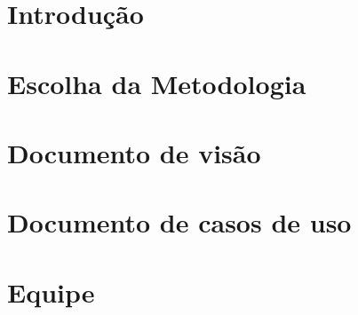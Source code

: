 \section{Introdução} %
\label{sec:introdu_o}
 

\section{Escolha da Metodologia} %
\label{sec:metodologia}
 

\section{Documento de visão}
\label{sec:document_de_visao}


\section{Documento de casos de uso}
\label{sec:documento_de_caso_de_uso}


\section{Equipe} %
\label{sec:equipe}


%

%
